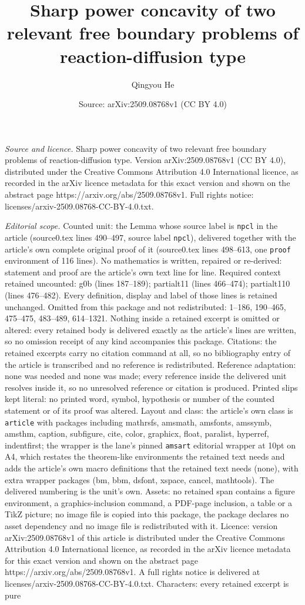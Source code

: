 \documentclass[10pt,a4paper]{amsart}
\title[Sharp power concavity of two relevant free boundary problems]{Sharp power concavity of two relevant free boundary problems of reaction-diffusion type}
\author{Qingyou He}
\date{Source: arXiv:2509.08768v1 (CC BY 4.0)}
\begin{document}
\maketitle

\noindent\emph{Source and licence.} Sharp power concavity of two relevant free boundary problems of reaction-diffusion type. Version arXiv:2509.08768v1 (CC BY 4.0), distributed under the Creative Commons Attribution 4.0 International licence, as recorded in the arXiv licence metadata for this exact version and shown on the abstract page https://arxiv.org/abs/2509.08768v1. Full rights notice: licenses/arxiv-2509.08768-CC-BY-4.0.txt.\par\smallskip

\noindent\textit{Editorial scope.} Counted unit: the Lemma whose source label is \texttt{npcl} in the article (source0.tex lines 490--497, source label \texttt{npcl}), delivered together with the article's own complete original proof of it (source0.tex lines 498--613, one \texttt{proof} environment of 116 lines). No mathematics is written, repaired or re-derived: statement and proof are the article's own text line for line. Required context retained uncounted: g0b (lines 187--189); partialt11 (lines 466--474); partialt110 (lines 476--482). Every definition, display and label of those lines is retained unchanged. Omitted from this package and not redistributed: 1--186, 190--465, 475--475, 483--489, 614--1321. Nothing inside a retained excerpt is omitted or altered: every retained body is delivered exactly as the article's lines are written, so no omission receipt of any kind accompanies this package. Citations: the retained excerpts carry no citation command at all, so no bibliography entry of the article is transcribed and no reference is redistributed. Reference adaptation: none was needed and none was made; every reference inside the delivered unit resolves inside it, so no unresolved reference or citation is produced. Printed slips kept literal: no printed word, symbol, hypothesis or number of the counted statement or of its proof was altered. Layout and class: the article's own class is \texttt{article} with packages including mathrsfs, amsmath, amsfonts, amssymb, amsthm, caption, subfigure, cite, color, graphicx, float, paralist, hyperref, indentfirst; the wrapper is the lane's pinned \texttt{amsart} editorial wrapper at 10pt on A4, which restates the theorem-like environments the retained text needs and adds the article's own macro definitions that the retained text needs (none), with extra wrapper packages (bm, bbm, dsfont, xspace, cancel, mathtools). The delivered numbering is the unit's own. Assets: no retained span contains a figure environment, a graphics-inclusion command, a PDF-page inclusion, a table or a TikZ picture; no image file is copied into this package, the package declares no asset dependency and no image file is redistributed with it. Licence: version arXiv:2509.08768v1 of this article is distributed under the Creative Commons Attribution 4.0 International licence, as recorded in the arXiv licence metadata for this exact version and shown on the abstract page https://arxiv.org/abs/2509.08768v1. A full rights notice is delivered at licenses/arxiv-2509.08768-CC-BY-4.0.txt. Characters: every retained excerpt is pure 
\end{document}
